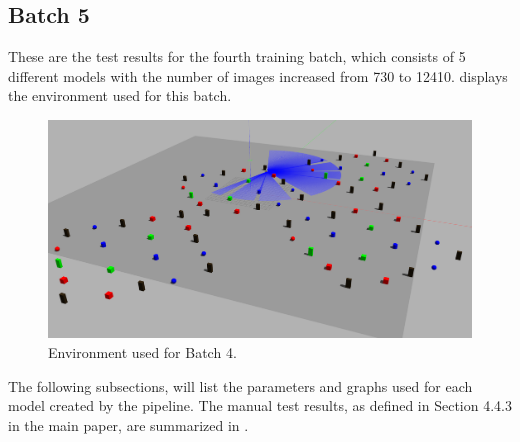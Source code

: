 \newpage

\subsection{Batch 5 \label{batch_5} }
These are the test results for the fourth training batch, which consists of 5 different models with the number of images increased from 730 to 12410.  displays the environment used for this batch.

\begin{figure}[H]%
\centering
\includegraphics[width=1\textwidth]{Bilder/env5.png} 
\caption[]{Environment used for Batch 4.}
\label{env5}
\end{figure}

The following subsections, will list the parameters and graphs used for each model created by the pipeline. The manual test results, as defined in Section 4.4.3 in the main paper, are summarized in .

\newpage

